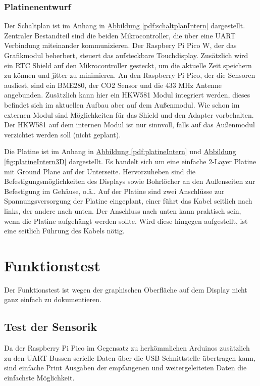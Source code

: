 \documentclass[a4paper,11pt]{article}
\newcounter{subsubsubsection}[subsubsection]
\begin{document}
\subsubsection{Platinenentwurf}
\label{subsubsub:platinenentwurfExtern} 

\label{subsubsubsub:schaltplanExtern}

Der Schaltplan ist im Anhang in \hyperref[pdf:schaltplanIntern]{Abbildung \ref{pdf:schaltplanIntern}} dargestellt. Zentraler Bestandteil sind die beiden Mikrocontroller, 
die über eine UART Verbindung miteinander kommunizieren. Der Raspbery Pi Pico W, der das Grafikmodul beherbert, steuert das aufsteckbare Touchdisplay. Zusätzlich wird
ein RTC Shield auf den Mikrocontroller gesteckt, um die aktuelle Zeit speichern zu können und jitter zu minimieren. 
An den Raspberry Pi Pico, der die Sensoren ausliest, sind ein BME280, der CO2 Sensor und die 433 MHz Antenne angebunden. Zusätzlich kann hier ein HKW581 Modul integriert werden, 
dieses befindet sich im aktuellen Aufbau aber auf dem Außenmodul. Wie schon im externen Modul sind Möglichkeiten für das Shield und den Adapter vorbehalten. 
Der HKW581 auf dem internen Modul ist nur sinnvoll, falls auf das Außenmodul verzichtet werden soll (nicht geplant).

\label{subsubsubsub:platineExtern}

Die Platine ist im Anhang in \hyperref[pdf:platineIntern]{Abbildung \ref{pdf:platineIntern}} und \hyperref[fig:platineIntern3D]{Abbildung \ref{fig:platineIntern3D}} dargestellt. Es handelt sich um eine einfache 2-Layer Platine mit Ground Plane
auf der Unterseite. Hervorzuheben sind die Befestigungsmöglichkeiten des Displays sowie Bohrlöcher an den Außenseiten zur Befestigung im Gehäuse, o.ä..
Auf der Platine sind zwei Anschlüsse zur Spannungsversorgung der Platine eingeplant, einer führt das Kabel seitlich nach links, der andere nach unten. 
Der Anschluss nach unten kann praktisch sein, wenn die Platine aufgehängt werden sollte. Wird diese hingegen aufgestellt, ist eine seitlich Führung des Kabels nötig. 


\section{Funktionstest}
\label{sub:funktionstest}

Der Funktionstest ist wegen der graphischen Oberfläche auf dem Display nicht ganz einfach zu dokumentieren. 

\subsection{Test der Sensorik}
\label{subsub:test-sensorik}
Da der Raspberry Pi Pico im Gegensatz zu herkömmlichen Arduinos zusätzlich zu den UART Bussen serielle Daten über die USB Schnittstelle übertragen kann, 
sind einfache Print Ausgaben der empfangenen und weitergeleiteten Daten die einfachste Möglichkeit. 
\end{document}

